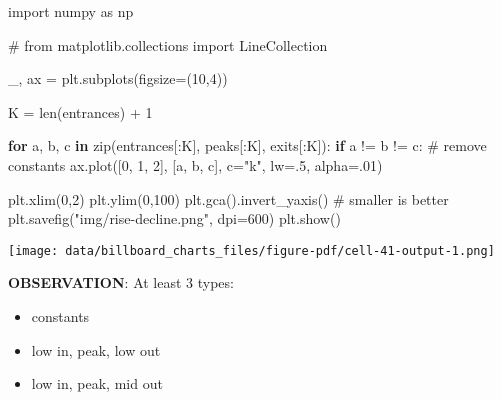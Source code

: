 \documentclass[
  a4paper,
]{scrbook}
\newenvironment{Shaded}{\begin{snugshade}}{\end{snugshade}}
\newcommand{\BuiltInTok}[1]{\textcolor[rgb]{0.00,0.23,0.31}{#1}}
\newcommand{\CommentTok}[1]{\textcolor[rgb]{0.37,0.37,0.37}{#1}}
\newcommand{\ControlFlowTok}[1]{\textcolor[rgb]{0.00,0.23,0.31}{\textbf{#1}}}
\newcommand{\DecValTok}[1]{\textcolor[rgb]{0.68,0.00,0.00}{#1}}
\newcommand{\FloatTok}[1]{\textcolor[rgb]{0.68,0.00,0.00}{#1}}
\newcommand{\ImportTok}[1]{\textcolor[rgb]{0.00,0.46,0.62}{#1}}
\newcommand{\KeywordTok}[1]{\textcolor[rgb]{0.00,0.23,0.31}{\textbf{#1}}}
\newcommand{\NormalTok}[1]{\textcolor[rgb]{0.00,0.23,0.31}{#1}}
\newcommand{\OperatorTok}[1]{\textcolor[rgb]{0.37,0.37,0.37}{#1}}
\newcommand{\StringTok}[1]{\textcolor[rgb]{0.13,0.47,0.30}{#1}}
\providecommand{\tightlist}{%
  \setlength{\itemsep}{0pt}\setlength{\parskip}{0pt}}\usepackage{longtable,booktabs,array}
\begin{document}
\begin{Shaded}
\begin{Highlighting}[]
\ImportTok{import}\NormalTok{ numpy }\ImportTok{as}\NormalTok{ np}
\end{Highlighting}
\end{Shaded}

\begin{Shaded}
\begin{Highlighting}[]
\CommentTok{\# from matplotlib.collections import LineCollection}
\end{Highlighting}
\end{Shaded}

\begin{Shaded}
\begin{Highlighting}[]
\NormalTok{\_, ax }\OperatorTok{=}\NormalTok{ plt.subplots(figsize}\OperatorTok{=}\NormalTok{(}\DecValTok{10}\NormalTok{,}\DecValTok{4}\NormalTok{))}

\NormalTok{K }\OperatorTok{=} \BuiltInTok{len}\NormalTok{(entrances) }\OperatorTok{+} \DecValTok{1}

\ControlFlowTok{for}\NormalTok{ a, b, c }\KeywordTok{in} \BuiltInTok{zip}\NormalTok{(entrances[:K], peaks[:K], exits[:K]):}
    \ControlFlowTok{if}\NormalTok{ a }\OperatorTok{!=}\NormalTok{ b }\OperatorTok{!=}\NormalTok{ c: }\CommentTok{\# remove constants}
\NormalTok{        ax.plot([}\DecValTok{0}\NormalTok{, }\DecValTok{1}\NormalTok{, }\DecValTok{2}\NormalTok{], [a, b, c], c}\OperatorTok{=}\StringTok{"k"}\NormalTok{, lw}\OperatorTok{=}\FloatTok{.5}\NormalTok{, alpha}\OperatorTok{=}\FloatTok{.01}\NormalTok{)}

\NormalTok{plt.xlim(}\DecValTok{0}\NormalTok{,}\DecValTok{2}\NormalTok{)}
\NormalTok{plt.ylim(}\DecValTok{0}\NormalTok{,}\DecValTok{100}\NormalTok{)}
\NormalTok{plt.gca().invert\_yaxis() }\CommentTok{\# smaller is better}
\NormalTok{plt.savefig(}\StringTok{"img/rise{-}decline.png"}\NormalTok{, dpi}\OperatorTok{=}\DecValTok{600}\NormalTok{)}
\NormalTok{plt.show()}
\end{Highlighting}
\end{Shaded}

\texttt{[image: data/billboard\_charts\_files/figure-pdf/cell-41-output-1.png]}

\textbf{OBSERVATION}: At least 3 types:

\begin{itemize}
\tightlist
\item
  constants
\item
  low in, peak, low out
\item
  low in, peak, mid out
\end{itemize}
\end{document}

